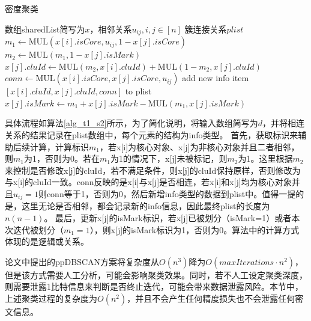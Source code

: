 \begin{algorithm}[htbp]
	\renewcommand{\algorithmicrequire}{\textbf{输入:}}
	\renewcommand{\algorithmicensure}{\textbf{输出:}}
	\caption{密度聚类}
	\label{alg_t1_s2}
	\begin{algorithmic}[1]
		\REQUIRE 数组sharedList简写为$ x $，相邻关系$ u_{ij},i,j\in[n] $
		\ENSURE 簇连接关系$ plist $
		\STATE $ m_1 \leftarrow \text{MUL}(x[i].isCore, u_{ij}, 1-x[j].isCore) $
		\STATE $ m_2 \leftarrow \text{MUL}(m_1, 1-x[j].isMark) $
		\STATE $ x[j].cluId \leftarrow  \text{MUL}(m_2, x[i].cluId) + \text{MUL}(1-m_2, x[j].cluId)$
		\STATE $ conn \leftarrow \text{MUL}(x[i].isCore, x[j].isCore, u_{ij}) $
		\STATE add new info item $ [x[i].cluId, x[j].cluId, conn] $ to plist
		\STATE $ x[j].isMark \leftarrow m_1 + x[j].isMark - \text{MUL}(m_1, x[j].isMark) $
		\ENDFOR
		\ENDFOR
	\end{algorithmic}
\end{algorithm}

具体流程如算法\ref{alg_t1_s2}所示，为了简化说明，将输入数组简写为$ d $，并将相连关系的结果记录在plist数组中，每个元素的结构为info类型。
首先，获取标识来辅助后续计算，计算标识$ m_1 $，若x[i]为核心对象、x[j]为非核心对象并且二者相邻，则$ m_1 $为1，否则为0。若在$ m_1 $为1的情况下，x[j]未被标记，则$ m_2 $为1。这里根据$ m_2 $来控制是否修改x[j]的cluId，若不满足条件，则x[j]的cluId保持原样，否则修改为与x[i]的cluId一致。conn反映的是x[i]与x[j]是否相连，若x[i]和x[j]均为核心对象并且$ u_{ij}=1 $则conn等于1，否则为0，然后新增info类型的数据到plist中。值得一提的是，这里无论是否相邻，都会记录新的info信息，因此最终plist的长度为$ n(n-1) $。
最后，更新x[j]的isMark标识，若x[j]已被划分（isMark=1）或者本次迭代被划分（$ m_1 = 1 $），则x[j]的isMark标识为1，否则为0。算法中的计算方式体现的是逻辑或关系。

论文\cite{bozdemir2021privacy}中提出的ppDBSCAN方案将复杂度从$ O(n^3)$降为$ O(maxIterations \cdot n^2) $，但是该方式需要人工分析，可能会影响聚类效果。同时，若不人工设定聚类深度，则需要泄露1比特信息来判断是否终止迭代，可能会带来数据泄露风险。本节中，上述聚类过程的复杂度为$ O(n^2) $，并且不会产生任何精度损失也不会泄露任何密文信息。

